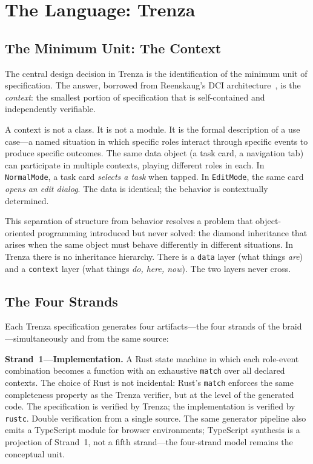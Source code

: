 \section{The Language: Trenza}
\label{sec:language}

\subsection{The Minimum Unit: The Context}
\label{sec:context}

The central design decision in Trenza is the identification of the minimum
unit of specification. The answer, borrowed from Reenskaug's DCI
architecture~\cite{reenskaug2009dci}, is the \emph{context}: the smallest
portion of specification that is self-contained and independently verifiable.

A context is not a class. It is not a module. It is the formal description
of a use case---a named situation in which specific roles interact through
specific events to produce specific outcomes. The same data object (a task
card, a navigation tab) can participate in multiple contexts, playing different
roles in each. In \texttt{NormalMode}, a task card \emph{selects a task} when
tapped. In \texttt{EditMode}, the same card \emph{opens an edit dialog}.
The data is identical; the behavior is contextually determined.

This separation of structure from behavior resolves a problem that
object-oriented programming introduced but never solved: the diamond
inheritance that arises when the same object must behave differently in
different situations. In Trenza there is no inheritance hierarchy. There is a
\texttt{data} layer (what things \emph{are}) and a \texttt{context} layer
(what things \emph{do, here, now}). The two layers never cross.

\subsection{The Four Strands}
\label{sec:strands}

Each Trenza specification generates four artifacts---the four
strands of the braid---simultaneously and from the same source:

\textbf{Strand~1---Implementation.} A Rust state machine in which each
role-event combination becomes a function with an exhaustive \texttt{match}
over all declared contexts. The choice of Rust is not incidental: Rust's
\texttt{match} enforces the same completeness property as the Trenza verifier,
but at the level of the generated code. The specification is verified by
Trenza; the implementation is verified by \texttt{rustc}. Double verification
from a single source. The same generator pipeline also emits a TypeScript
module for browser environments; TypeScript synthesis is a projection of
Strand~1, not a fifth strand---the four-strand model remains the conceptual
unit.

